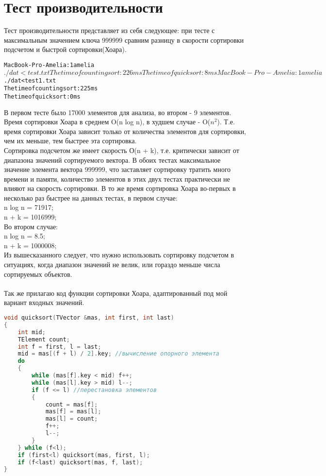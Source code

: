 \documentclass[pdf, unicode, 12pt, a4paper,oneside,fleqn]{article}
\begin{document}
\section{Тест производительности}
Тест производительности представляет из себя следующее: при тесте с максимальным значением ключа 999999 сравним разницу в скорости сортировки подсчетом и быстрой сортировки(Хоара). 

\begin{alltt}
MacBook-Pro-Amelia:1 amelia$ ./dat < test.txt
The time of counting sort: 226 ms
The time of quick sort: 8 ms
MacBook-Pro-Amelia:1 amelia$ ./dat < test1.txt
The time of counting sort: 225 ms
The time of quick sort: 0 ms
\end{alltt}

В первом тесте было 17000 элементов для анализа, во втором - 9 элементов. Время сортировки Хоара в среднем O(n log n), в худшем случае - O($n^2$). Т.е. время сортировки Хоара зависит только от количества элементов для сортировки, чем их меньше, тем быстрее эта сортировка. \\
Сортировка подсчетом же имеет скорость О(n + k), т.е. критически зависит от диапазона значений сортируемого вектора. В обоих тестах максимальное значение элемента вектора 999999, что заставляет сортировку тратить много времени и памяти, количество элементов в этих двух тестах практически не влияют на скорость сортировки. В то же время сортировка Хоара во-первых в несколько раз быстрее на данных тестах, в первом случае: \\n log n = 71917;\\n + k = 1016999;\\Во втором случае: \\n log n = 8.5;\\n + k = 1000008;\\ Из вышесказанного следует, что нужно использовать сортировку подсчетом в ситуациях, когда диапазон значений не велик, или гораздо меньше числа сортируемых объектов.  \\ \\ Так же прилагаю код функции сортировки Хоара, адаптированный под мой вариант входных значений.
\begin{lstlisting}[language=C++]
void quicksort(TVector &mas, int first, int last)
{
    int mid;
    TElement count;
    int f = first, l = last;
    mid = mas[(f + l) / 2].key; //вычисление опорного элемента
    do
    {
        while (mas[f].key < mid) f++;
        while (mas[l].key > mid) l--;
        if (f <= l) //перестановка элементов
        {
            count = mas[f];
            mas[f] = mas[l];
            mas[l] = count;
            f++;
            l--;
        }
    } while (f<l);
    if (first<l) quicksort(mas, first, l);
    if (f<last) quicksort(mas, f, last);
}
\end{lstlisting}
\pagebreak
\end{document}
